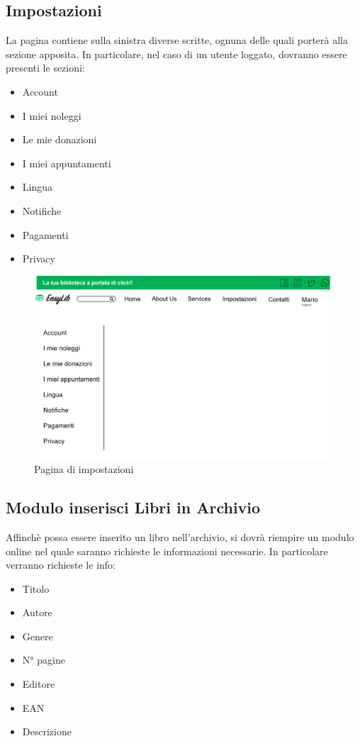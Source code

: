 \documentclass{article}
\begin{document}
\subsection{Impostazioni}
La pagina contiene sulla sinistra diverse scritte, ognuna delle quali porterà alla sezione apposita. In particolare, nel caso di un utente loggato, dovranno essere presenti le sezioni:
\begin{itemize}
    \item Account
    \item I miei noleggi
    \item Le mie donazioni
    \item I miei appuntamenti
    \item Lingua
    \item Notifiche
    \item Pagamenti
    \item Privacy
\end{itemize}

\begin{figure}[H]
    \centering
    \includegraphics[width=130mm]{D1/Images/impostazioni.png}
    \caption{Pagina di impostazioni}
\end{figure}

\subsection{Modulo inserisci Libri in Archivio}
Affinchè possa essere inserito un libro nell’archivio, si dovrà riempire un modulo online nel quale saranno richieste le informazioni necessarie. In particolare verranno richieste le info:
\begin{itemize}
    \item Titolo
    \item Autore
    \item Genere
    \item N° pagine
    \item Editore
    \item EAN
    \item Descrizione
\end{itemize}
\end{document}
